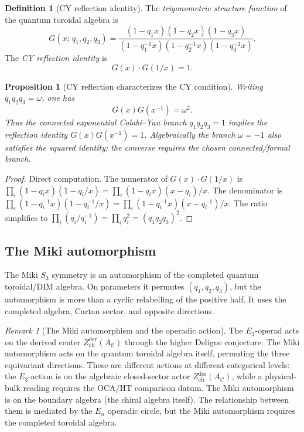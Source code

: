 \documentclass[11pt]{article}
\theoremstyle{plain}
\newtheorem{proposition}[theorem]{Proposition}
\theoremstyle{definition}
\newtheorem{definition}[theorem]{Definition}
\theoremstyle{remark}
\newtheorem{remark}[theorem]{Remark}
\newcommand{\cC}{\mathcal{C}}
\newcommand{\Ethree}{E_3}
\newcommand{\En}{E_n}
\newcommand{\Zder}{Z^{\mathrm{der}}_{\mathrm{ch}}}
\begin{document}
\begin{definition}[CY reflection identity]
\label{def:v3-qg-cy-reflection}
The \emph{trigonometric structure function} of the quantum toroidal
algebra is
\[
 G(x;\, q_1, q_2, q_3)
 = \frac{(1 - q_1 x)(1 - q_2 x)(1 - q_3 x)}
 {(1 - q_1^{-1}x)(1 - q_2^{-1}x)(1 - q_3^{-1}x)}.
\]
The \emph{CY reflection identity} is
\[
 G(x) \cdot G(1/x) = 1.
\]
\end{definition}

\begin{proposition}[CY reflection characterizes the CY condition]
\label{prop:v3-qg-cy-reflection}
Writing $q_1 q_2 q_3=\omega$, one has
\[
G(x)G(x^{-1})=\omega^2.
\]
Thus the connected exponential Calabi--Yau branch
$q_1q_2q_3=1$ implies the reflection identity
$G(x)G(x^{-1})=1$. Algebraically the branch $\omega=-1$ also
satisfies the squared identity; the converse requires the chosen
connected/formal branch.
\end{proposition}

\begin{proof}
Direct computation.  The numerator of $G(x) \cdot G(1/x)$ is
$\prod_i (1 - q_i x)(1 - q_i/x) = \prod_i (1 - q_i x)(x - q_i)/x$.
The denominator is
$\prod_i (1 - q_i^{-1}x)(1 - q_i^{-1}/x) = \prod_i
(1 - q_i^{-1}x)(x - q_i^{-1})/x$.
The ratio simplifies to $\prod_i (q_i/q_i^{-1}) = \prod_i q_i^2
= (q_1 q_2 q_3)^2$.
\end{proof}

\subsection{The Miki automorphism}

The Miki $S_3$ symmetry is an automorphism of the completed
quantum toroidal/DIM algebra. On parameters it permutes
$(q_1,q_2,q_3)$, but the automorphism is more than a cyclic
relabelling of the positive half. It uses the completed algebra,
Cartan sector, and opposite directions.

\begin{remark}[The Miki automorphism and the operadic action]
\label{rem:v3-qg-miki-non-operadic}
The $\Ethree$-operad acts on the derived center $\Zder(A_\cC)$
through the higher Deligne conjecture.  The Miki automorphism acts
on the quantum toroidal algebra itself, permuting the three
equivariant directions.  These are different actions at different
categorical levels: the $\Ethree$-action is on the algebraic
closed-sector actor $\Zder(A_\cC)$, while a physical-bulk reading
requires the OCA/HT comparison datum.  The Miki automorphism is on
the boundary algebra (the chiral algebra itself).  The relationship
between them is mediated by the $\En$ operadic circle, but the
Miki automorphism requires the completed toroidal algebra.
\end{remark}
\end{document}
